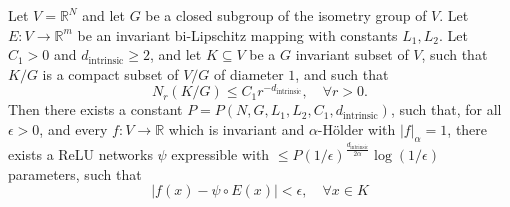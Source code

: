 \documentclass[twoside,11pt]{article}
\newcommand{\RR}{\mathbb{R}}
\newcommand{\dint}{d_{\text{intrinsic}}}
\begin{document}
\begin{theorem}\label{thm:bi_lip}
Let $V=\RR^N$ and let $G$ be a closed subgroup of the isometry group of $V$. Let $E:V\to \RR^m$ be an invariant  bi-Lipschitz mapping with constants $L_1,L_2$. Let $C_1>0$ and $\dint\geq 2 $, and let $K\subseteq V$ be a $G$ invariant subset of $V$, such that $K/G$ is a  compact subset of  $V/G$ of diameter $1$, and such that
$$N_r(K/G)\leq C_1r^{-\dint}, \quad \forall r> 0 .$$
Then there exists a constant $P=P(N,G,L_1,L_2,C_1,\dint)$, such that, for all $\epsilon>0$, and every
$f:V \to \RR$  which is invariant and $\alpha$-H\"older with $|f|_\alpha=1 $,  there exists a ReLU networks $\psi$ expressible with  $\leq  P(1/\epsilon)^{\frac{\dint}{2\alpha}}\log(1/\epsilon) $ parameters, such that 
$$|f(x)-\psi\circ E(x)|<\epsilon, \quad  \forall x \in K $$
\end{theorem}
\end{document}
